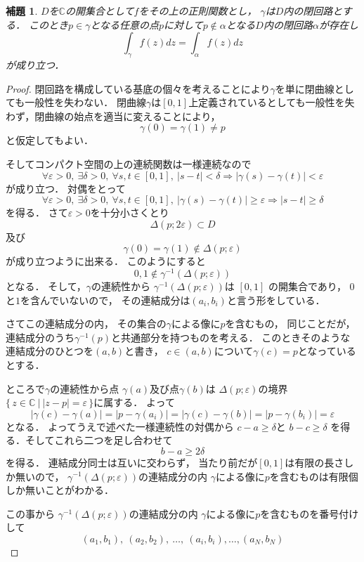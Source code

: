 \documentclass[leqno, 12pt, a4paper]{jsarticle}
\newtheorem{lem}[thm]{補題}
\newcommand{\cc}{\mathbb{C}}
\newcommand{\ep}{\varepsilon}
\begin{document}
\begin{lem}\label{alp}
$D$を$\cc$の開集合として$f$をその上の正則関数とし，
$\gamma$は$D$内の閉回路とする．
このとき$p\in \gamma$となる任意の点$p$に対して$p\not\in \alpha$となる$D$内の閉回路$\alpha$が存在し
\[
\int_{\gamma}f(z)dz=\int_{\alpha}f(z)dz
\]
が成り立つ．
\end{lem}\label{lem}
\begin{proof}
閉回路を構成している基底の個々を考えることにより$\gamma$を単に閉曲線としても一般性を失わない．
閉曲線$\gamma$は$[0,1]$上定義されているとしても一般性を失わず，閉曲線の始点を適当に変えることにより，
\[
\gamma(0)=\gamma(1)\neq p
\]
と仮定してもよい．

そしてコンパクト空間の上の連続関数は一様連続なので
\[
\forall \varepsilon>0, \ 
\exists \delta>0, \ 
\forall s,t\in [0,1], \ 
|s-t|<\delta \Rightarrow |\gamma(s)-\gamma(t)|<\varepsilon
\]
が成り立つ．
対偶をとって
\[
\forall \varepsilon>0, \ 
\exists \delta>0, \ 
\forall s,t\in [0,1], \ 
|\gamma(s)-\gamma(t)|\ge\varepsilon \Rightarrow |s-t|\ge \delta
\]
を得る．
さて$\varepsilon>0$を十分小さくとり
\[
\Delta(p; 2\varepsilon)\subset D
\]
及び
\[
\gamma(0)=\gamma(1)\not\in \Delta(p;\varepsilon)
\]
が成り立つように出来る．
このようにすると
\[
0,1\not\in\gamma^{-1}(\Delta(p; \varepsilon))
\]
となる．
そして，$\gamma$の連続性から
$\gamma^{-1}(\Delta(p; \varepsilon))$は
$[0,1]$
の開集合であり，
$0$と$1$を含んでいないので，
その連結成分は$(a_i,b_i)$と言う形をしている．
\par
さてこの連結成分の内，
その集合の$\gamma$による像に$p$を含むもの，
同じことだが，
連結成分のうち$\gamma^{-1}(p)$と共通部分を持つものを考える．
このときそのような連結成分のひとつを$(a, b)$と書き，
$c\in (a,b)$について$\gamma(c)=p$となっているとする．
\par
ところで$\gamma$の連続性から点
$\gamma(a)$及び点$\gamma(b)$は
$\Delta(p;\varepsilon)$の境界
$\{\, z\in \cc\ |\ |z-p|=\ep \, \}$に属する．
よって
\[
|\gamma(c)-\gamma(a)|=
|p-\gamma(a_i)|=|\gamma(c)-\gamma(b)|=|p-\gamma(b_i)|=
\varepsilon
\]
となる．
よってうえで述べた一様連続性の対偶から
$c-a\ge \delta$と
$b-c\ge \delta$
を得る．そしてこれら二つを足し合わせて
\[
b-a\ge 2\delta
\]
を得る．
連結成分同士は互いに交わらず，
当たり前だが$[0,1]$は有限の長さしか無いので，
$\gamma^{-1}(\Delta(p; \varepsilon))$の連結成分の内
$\gamma$による像に$p$を含むものは有限個しか無いことがわかる．\par
この事から
$\gamma^{-1}(\Delta(p;\varepsilon))$の連結成分の内
$\gamma$による像に$p$を含むものを番号付けして
\[
(a_1,b_1),\ (a_2,b_2),\ \dots,\ (a_i,b_i),\dots,(a_N,b_N)
\]
\end{proof}
\end{document}
